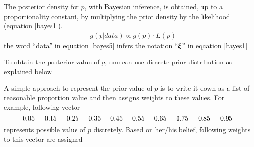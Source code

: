 The posterior density for $p$, with Bayesian inference, is obtained, up to a proportionality constant, by multiplying the prior density by the likelihood (equation \eqref{bayes1}).
\begin{eqnarray}
&& g(p|data) \propto g(p)\cdot L(p) \label{bayes5}
\end{eqnarray}
the word ``data'' in equation \eqref{bayes5} infers the notation ``$\mbox{\boldmath$\xi$}$'' in equation \eqref{bayes1}

To obtain the posterior value of $p$, one can use discrete prior distribution as explained below

A simple approach to represent the prior value of $p$ is to write it down as a list of reasonable proportion value and then assigns weights to these values. For example, following vector
\[
0.05 \hspace{0.5cm}0.15	\hspace{0.5cm}0.25\hspace{0.5cm}0.35\hspace{0.5cm}0.45\hspace{0.5cm}0.55\hspace{0.5cm}0.65\hspace{0.5cm}0.75\hspace{0.5cm}0.85\hspace{0.5cm}0.95
\]
represents possible value of $p$ discretely. Based on her/his belief, following weights to this vector are assigned

